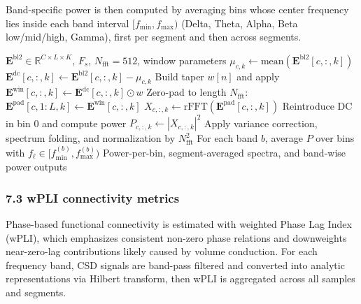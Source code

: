 Band-specific power is then computed by averaging bins whose center frequency lies inside each band interval $[f_{\min},f_{\max})$ (Delta, Theta, Alpha, Beta low/mid/high, Gamma), first per segment and then across segments.

\begin{algorithm}[H]
\caption{Spectral analysis via FFT (as in \texttt{FFT.jl})}
\begin{algorithmic}
\Require $\mathbf{E}^{\mathrm{bl2}}\in\mathbb{R}^{C\times L\times K}$, $F_s$, $N_{\mathrm{fft}}=512$, window parameters
    \State $\mu_{c,k}\gets \mathrm{mean}(\mathbf{E}^{\mathrm{bl2}}[c,:,k])$
    \State $\mathbf{E}^{\mathrm{dc}}[c,:,k]\gets \mathbf{E}^{\mathrm{bl2}}[c,:,k]-\mu_{c,k}$
    \State Build taper $w[n]$ and apply $\mathbf{E}^{\mathrm{win}}[c,:,k]\gets \mathbf{E}^{\mathrm{dc}}[c,:,k]\odot w$
    \State Zero-pad to length $N_{\mathrm{fft}}$: $\mathbf{E}^{\mathrm{pad}}[c,1\!:\!L,k]\gets \mathbf{E}^{\mathrm{win}}[c,:,k]$
    \State $X_{c,:,k}\gets \mathrm{rFFT}(\mathbf{E}^{\mathrm{pad}}[c,:,k])$
    \State Reintroduce DC in bin 0 and compute power $P_{c,:,k}\gets |X_{c,:,k}|^2$
    \State Apply variance correction, spectrum folding, and normalization by $N_{\mathrm{fft}}^2$
  \EndFor
\EndFor
\State For each band $b$, average $P$ over bins with $f_\ell\in[f_{\min}^{(b)},f_{\max}^{(b)})$
\Ensure Power-per-bin, segment-averaged spectra, and band-wise power outputs
\end{algorithmic}
\end{algorithm}

\subsubsection*{7.3 wPLI connectivity metrics}
Phase-based functional connectivity is estimated with weighted Phase Lag Index (wPLI), which emphasizes consistent non-zero phase relations and downweights near-zero-lag contributions likely caused by volume conduction. For each frequency band, CSD signals are band-pass filtered and converted into analytic representations via Hilbert transform, then wPLI is aggregated across all samples and segments.

